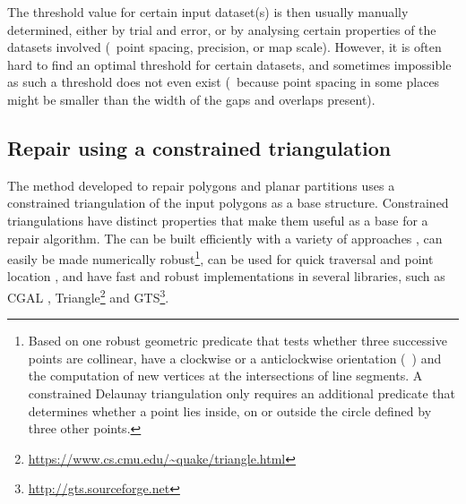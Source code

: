 The threshold value for certain input dataset(s) is then usually manually determined, either by trial and error, or by analysing certain properties of the datasets involved (\eg\ point spacing, precision, or map scale).
However, it is often hard to find an optimal threshold for certain datasets, and sometimes impossible as such a threshold does not even exist (\eg\ because point spacing in some places might be smaller than the width of the gaps and overlaps present).

\subsection{Repair using a constrained triangulation}

The method developed to repair polygons and planar partitions uses a constrained triangulation of the input polygons as a base structure.
Constrained triangulations have distinct properties that make them useful as a base for a repair algorithm.
The can be built efficiently with a variety of approaches \citep{Guibas85,Clarkson92}, can easily be made numerically robust\footnote{Based on one robust geometric predicate that tests whether three successive points are collinear, have a clockwise or a anticlockwise orientation (\eg\ \citet{Shewchuk96a}) and the computation of new vertices at the intersections of line segments.
A constrained Delaunay triangulation only requires an additional predicate that determines whether a point lies inside, on or outside the circle defined by three other points.}, can be used for quick traversal and point location \citep{Mucke99}, and have fast and robust implementations in several libraries, such as CGAL \citep{Boissonnat02}, Triangle\footnote{\url{https://www.cs.cmu.edu/~quake/triangle.html}} \citep{Shewchuk97} and GTS\footnote{\url{http://gts.sourceforge.net}}.


